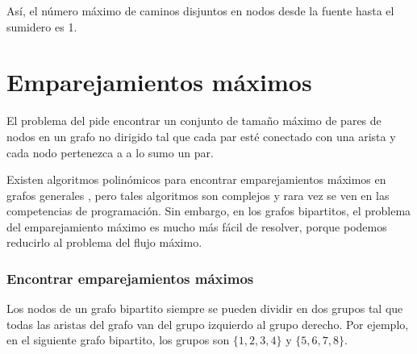 Así, el número máximo de caminos disjuntos en nodos
desde la fuente hasta el sumidero es 1.

\section{Emparejamientos máximos}


El problema del  pide encontrar
un conjunto de tamaño máximo de pares de nodos en un grafo no dirigido
tal que cada par esté conectado con una arista y
cada nodo pertenezca a a lo sumo un par.

Existen algoritmos polinómicos para encontrar
emparejamientos máximos en grafos generales \cite{edm65},
pero tales algoritmos son complejos y
rara vez se ven en las competencias de programación.
Sin embargo, en los grafos bipartitos,
el problema del emparejamiento máximo es mucho más fácil
de resolver, porque podemos reducirlo al
problema del flujo máximo.

\subsubsection{Encontrar emparejamientos máximos}

Los nodos de un grafo bipartito siempre se pueden
dividir en dos grupos tal que todas las aristas
del grafo van del grupo izquierdo al grupo derecho.
Por ejemplo, en el siguiente grafo bipartito,
los grupos son $\{1,2,3,4\}$ y $\{5,6,7,8\}$.

